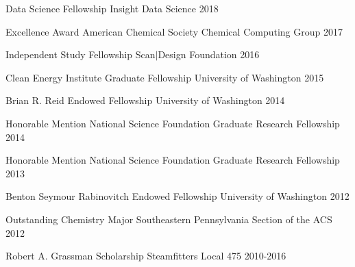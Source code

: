 



\begin{cvhonors}

\cvhonor
{Data Science Fellowship} %
{Insight Data Science} %
{} %
{2018} %


\cvhonor
{Excellence Award} %
{American Chemical Society Chemical Computing Group} %
{} %
{2017} %


\cvhonor
{Independent Study Fellowship} %
{Scan$|$Design Foundation} %
{} %
{2016} %


\cvhonor
{Clean Energy Institute Graduate Fellowship} %
{University of Washington} %
{} %
{2015} %


\cvhonor
{Brian R. Reid Endowed Fellowship} %
{University of Washington} %
{} %
{2014} %


\cvhonor
{Honorable Mention} %
{National Science Foundation Graduate Research Fellowship} %
{} %
{2014} %


\cvhonor
{Honorable Mention} %
{National Science Foundation Graduate Research Fellowship} %
{} %
{2013} %


\cvhonor
{Benton Seymour Rabinovitch Endowed Fellowship} %
{University of Washington} %
{} %
{2012} %


\cvhonor
{Outstanding Chemistry Major} %
{Southeastern Pennsylvania Section of the ACS} %
{} %
{2012} %


\cvhonor
{Robert A. Grassman Scholarship} %
{Steamfitters Local 475} %
{} %
{2010-2016} %


\end{cvhonors}
\vspace{-1cm}
